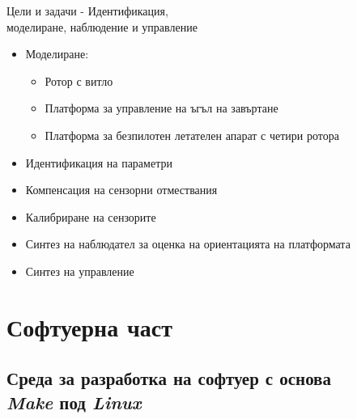 \documentclass[handout]{beamer}
\begin{document}
\begin{frame}{Цели и задачи -  Идентификация,\\ моделиране, наблюдение и управление }
	\begin{itemize}
		\pause 
		\item Моделиране:

		\begin{itemize}
			\pause 
			\item Ротор с витло

			\pause 
			\item Платформа за управление на ъгъл на завъртане

			\pause 
			\item Платформа за безпилотен летателен апарат с четири ротора

		\end{itemize}
		\pause 
		\item Идентификация на параметри

		\pause 
		\item Компенсация на сензорни отмествания

		\pause
		\item Калибриране на сензорите

		\pause
		\item Синтез на наблюдател за оценка на ориентацията на платформата

		\pause 
		\item Синтез на управление
	\end{itemize}
\end{frame}



\section{Софтуерна част}

\subsection{Среда за разработка на софтуер с основа\\\textit{Make} под \textit{Linux}}
\end{document}
